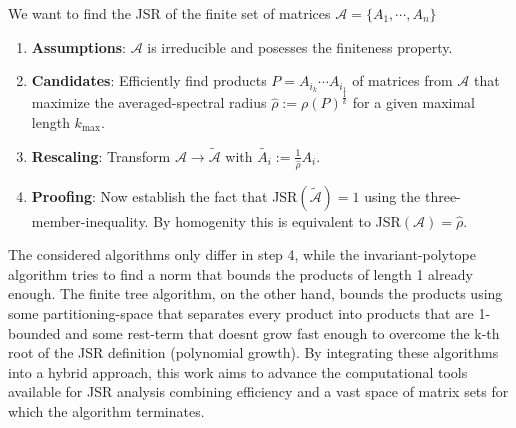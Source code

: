 We want to find the JSR of the finite set of matrices $\mathcal{A} = \{A_1, \cdots, A_n\}$
\begin{enumerate}
    \item \textbf{Assumptions}: $\mathcal{A}$ is irreducible and posesses the finiteness property. 
    \item \textbf{Candidates}: Efficiently find products $P = A_{i_k} \cdots A_{i_1}$ of matrices from $\mathcal{A}$ that maximize the averaged-spectral radius $\hat{\rho} := \rho(P)^\frac{1}{k}$ for a given maximal length $k_{\text{max}}$.
    \item \textbf{Rescaling}: Transform $\mathcal{A} \to \tilde{\mathcal{A}}$ with $\tilde{A_i} := \frac{1}{\hat{\rho}} A_i$.
    \item \textbf{Proofing}: Now establish the fact that JSR$(\tilde{\mathcal{A}}) = 1$ using the three-member-inequality. By homogenity this is equivalent to JSR$(\mathcal{A}) = \hat{\rho}$.
\end{enumerate}

The considered algorithms only differ in step 4, while the invariant-polytope algorithm tries to find a norm that bounds the products of length 1 already enough. The finite tree algorithm, on the other hand, bounds the products using some partitioning-space that separates every product into products that are 1-bounded and some rest-term that doesnt grow fast enough to overcome the k-th root of the JSR definition (polynomial growth).
By integrating these algorithms into a hybrid approach, this work aims to advance the computational tools available for JSR analysis combining efficiency and a vast space of matrix sets for which the algorithm terminates.
